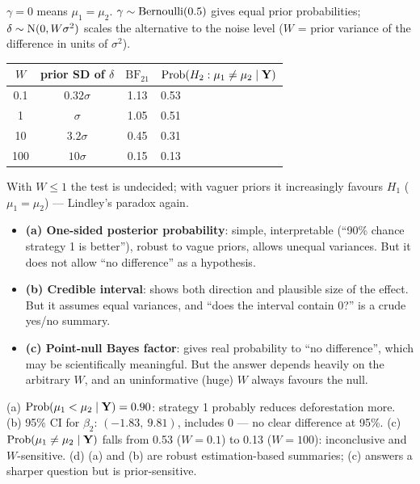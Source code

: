 \documentclass[11pt]{article}
\begin{document}
 $\gamma=0$ means $\mu_1=\mu_2$. $\gamma\sim\mathrm{Bernoulli}(0.5)$ gives equal prior probabilities; $\delta\sim\mathrm{N}(0,W\sigma^2)$ scales the alternative to the noise level ($W$ = prior variance of the difference in units of $\sigma^2$).
\begin{center}
\begin{tabular}{cccl}\toprule
$W$ & prior SD of $\delta$ & $\text{BF}_{21}$ & $\mathrm{Prob}(H_2:\mu_1\neq\mu_2\mid\mathbf Y)$\\\midrule
0.1 & $0.32\sigma$ & 1.13 & 0.53\\
1 & $\sigma$ & 1.05 & 0.51\\
10 & $3.2\sigma$ & 0.45 & 0.31\\
100 & $10\sigma$ & 0.15 & 0.13\\\bottomrule
\end{tabular}
\end{center}
With $W\le1$ the test is undecided; with vaguer priors it increasingly favours $H_1$ ($\mu_1=\mu_2$) --- Lindley's paradox again.

\begin{itemize}
\item \textbf{(a) One-sided posterior probability}: simple, interpretable (``90\% chance strategy 1 is better''), robust to vague priors, allows unequal variances. But it does not allow ``no difference'' as a hypothesis.
\item \textbf{(b) Credible interval}: shows both direction and plausible size of the effect. But it assumes equal variances, and ``does the interval contain 0?'' is a crude yes/no summary.
\item \textbf{(c) Point-null Bayes factor}: gives real probability to ``no difference'', which may be scientifically meaningful. But the answer depends heavily on the arbitrary $W$, and an uninformative (huge) $W$ always favours the null.
\end{itemize}

\begin{answer}
(a) $\mathrm{Prob}(\mu_1<\mu_2\mid\mathbf Y)=0.90$: strategy 1 probably reduces deforestation more. (b) 95\% CI for $\beta_2$: $(-1.83,\ 9.81)$, includes 0 --- no clear difference at 95\%. (c) $\mathrm{Prob}(\mu_1\neq\mu_2\mid\mathbf Y)$ falls from 0.53 ($W=0.1$) to 0.13 ($W=100$): inconclusive and $W$-sensitive. (d) (a) and (b) are robust estimation-based summaries; (c) answers a sharper question but is prior-sensitive.
\end{answer}
\end{document}

